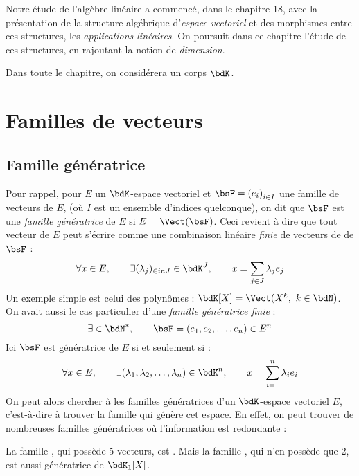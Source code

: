 \documentclass[a4paper,french,bookmarks]{article}
\begin{document}

Notre étude de l'algèbre linéaire a commencé, dans le chapitre 18, avec la présentation de la structure algébrique d'\textit{espace vectoriel} et des morphismes entre ces structures, les \textit{applications linéaires}. On poursuit dans ce chapitre l'étude de ces structures, en rajoutant la notion de \textit{dimension}.

\initcours{}

Dans toute le chapitre, on considérera un corps $\bdK$.

\section{Familles de vecteurs}

\subsection{Famille génératrice}


Pour rappel, pour $E$ un $\bdK$-espace vectoriel et $\bsF = \left(e_i\right)_{i \in I}$ une famille de vecteurs de $E$, (où $I$ est un ensemble d'indices quelconque), on dit que $\bsF$ est une \textit{famille génératrice} de $E$ si $E = \Vect(\bsF)$. Ceci revient à dire que tout vecteur de $E$ peut s'écrire comme une combinaison linéaire \textit{finie} de vecteurs de de $\bsF$ :
%
\[ \forall x \in E,\qquad \exists (\lambda_j)_{\in in J} \in \bdK^J,\qquad x = \sum_{j \in J} \lambda_j e_j\]
%
Un exemple simple est celui des polynômes : $\bdK[X] = \Vect(X^k,\ k \in \bdN)$. On avait aussi le cas particulier d'une \textit{famille génératrice finie} : 
%
\[ \exists \in \bdN^*,\qquad \bsF = (e_1, e_2, \dots, e_n) \in E^n\]
%
Ici $\bsF$ est génératrice de $E$ si et seulement si :
%
\[ \forall x \in E,\qquad \exists (\lambda_1, \lambda_2, \dots, \lambda_n) \in \bdK^n,\qquad x = \sum_{i=1}^n \lambda_i e_i\]
%
On peut alors chercher à  les familles génératrices d'un $\bdK$-espace vectoriel $E$, c'est-à-dire à trouver la  famille qui génère cet espace. En effet, on peut trouver de nombreuses familles génératrices où l'information est redondante :

\begin{example}{}{}
    La famille , qui possède 5 vecteurs, est . Mais la famille , qui n'en possède que 2, est aussi génératrice de $\bdK_1[X]$.
\end{example}
\end{document}
